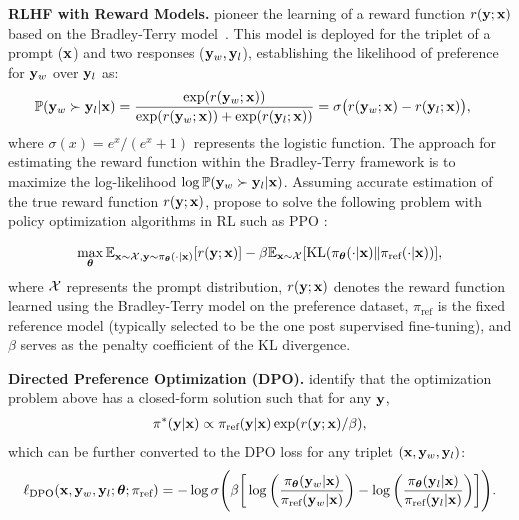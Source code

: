 \textbf{RLHF with Reward Models.} \citet{ChristianoLBMLA17} pioneer the learning of a reward function $r(\mathbf{y} ;\mathbf{x})$ based on the Bradley-Terry model~\citep{bradley1952rank}. This model is deployed for 
the triplet of a prompt ($\mathbf{x}$) and two responses ($\mathbf{y}_w,\mathbf{y}_l$), establishing the likelihood of preference for $\mathbf{y}_w$ over $\mathbf{y}_l$ as:
\begin{align}
    \mathbb{P}(\mathbf{y}_w \succ \mathbf{y}_l | \mathbf{x})
    & = 
    \frac{\exp(r(\mathbf{y}_w; \mathbf{x}))}{\exp(r(\mathbf{y}_w; \mathbf{x})) + \exp(r(\mathbf{y}_l; \mathbf{x}))}
    =
    \sigma \big(r(\mathbf{y}_w; \mathbf{x})-r(\mathbf{y}_l; \mathbf{x})
    \big),
\end{align}
where $\sigma(x) = e^x / (e^x + 1)$ represents the logistic function. The approach for estimating the reward function within the Bradley-Terry framework is to maximize the log-likelihood $\log \mathbb{P}(\mathbf{y}_w \succ \mathbf{y}_l | \mathbf{x})$. Assuming accurate estimation of the true reward function $r(\mathbf{y}; \mathbf{x})$, \citet{ChristianoLBMLA17} propose to solve the following problem with policy optimization algorithms in RL such as PPO \citep{PPO}:

\begin{align}
    \max_{\bm{\theta}} 
    \mathbb{E}_{\mathbf{x} \sim \mathcal{X}, \mathbf{y} \sim \pi_{\bm{\theta}}(\cdot|\mathbf{x})}
    [
    r(\mathbf{y}; \mathbf{x})
    ]
    -
    \beta
    \mathbb{E}_{\mathbf{x} \sim \mathcal{X}}
    [\mathrm{KL}(\pi_{\bm{\theta}}(\cdot|\mathbf{x}) \| \pi_{\text{ref}}(\cdot|\mathbf{x}))],
\end{align}
where $\mathcal{X}$ represents the prompt distribution,
$r(\mathbf{y}; \mathbf{x})$ denotes the reward function learned using the Bradley-Terry model on the preference dataset,
$\pi_{\text{ref}}$ is the fixed reference model (typically selected to be the one post supervised fine-tuning), and $\beta$ serves as the penalty coefficient of the KL divergence.

\textbf{Directed Preference Optimization (DPO).}
\citet{DPO} identify that the optimization problem above has a closed-form solution such that for any $\mathbf{y}$,
\begin{align*}
    \pi^*(\mathbf{y}|\mathbf{x})
    \propto 
    \pi_{\text{ref}}(\mathbf{y}|\mathbf{x})
    \exp( r(\mathbf{y}; \mathbf{x}) / \beta),
\end{align*}
which can be further converted to the DPO loss for any triplet $(\mathbf{x}, \mathbf{y}_{w}, \mathbf{y}_{l})$:
\begin{equation}
    \ell_{\text{DPO}}(\mathbf{x}, \mathbf{y}_{w}, \mathbf{y}_{l}; \bm{\theta}; \pi_{\text{ref}})
    = 
    -\log \sigma \Bigg(
    \beta \bigg[
    \log \bigg(\frac{\pi_{\bm{\theta}}(\mathbf{y}_{w}|\mathbf{x})}{\pi_{\text{ref}}(\mathbf{y}_{w}|\mathbf{x})}\bigg)
    -
    \log \bigg(\frac{\pi_{\bm{\theta}}(\mathbf{y}_{l}|\mathbf{x})}{\pi_{\text{ref}}(\mathbf{y}_{l}|\mathbf{x})}\bigg)
    \bigg]
    \Bigg).
    \label{eq:DPO2}
\end{equation}
